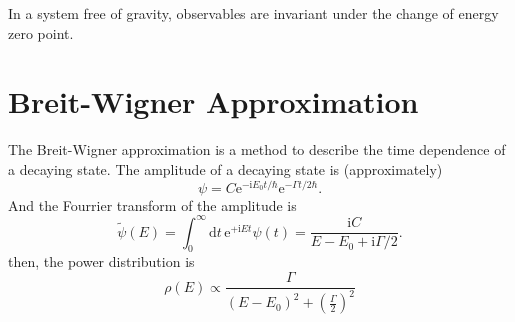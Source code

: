 In a system free of gravity, observables are invariant under the change of energy zero point.

\section[Breit-Wigner 近似]{Breit-Wigner Approximation}
The Breit-Wigner approximation is a method to describe the time dependence of a decaying state. The amplitude of a decaying state is (approximately) 
\begin{equation}
  \psi = C \mathrm{e}^{- \mathrm{i} E_0 t / \hbar} \mathrm{e}^{- \Gamma t / 2 \hbar}.
\end{equation}
And the Fourrier transform of the amplitude is
\begin{equation}
  \tilde{\psi} \left( E \right) = \int_{0}^{\infty} \mathrm{d}t \,  \mathrm{e}^{+ \mathrm{i}  Et} \psi\left( t \right) = \frac{\mathrm{i} C}{E - E_0 + \mathrm{i} \Gamma / 2}.
\end{equation}
then, the power distribution is
\begin{equation}
  \rho \left( E \right) \propto \frac{\Gamma}{\left( E - E_0 \right) ^{2} + \left( \frac{\Gamma}{2} \right) ^{2}}
\end{equation}